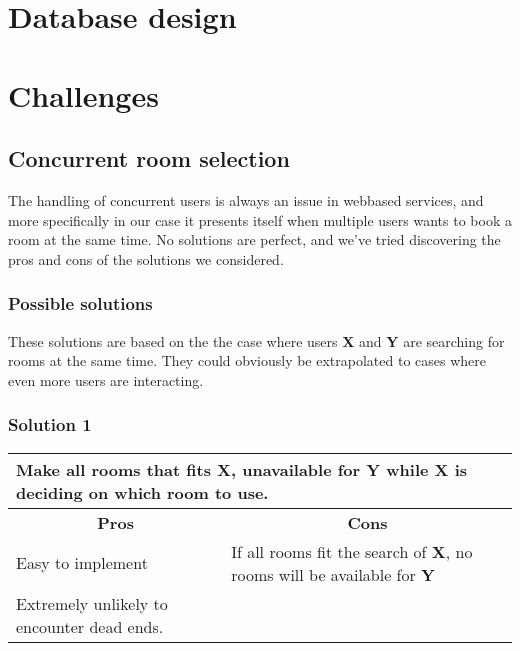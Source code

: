 \section{Database design}
\label{sec:database_design}



\section{Challenges}
\label{sec:challenges}
\subsection{Concurrent room selection}
\label{sub:challenges_concurrent_rooms}
The handling of concurrent users is always an issue in webbased services, and more specifically in our case it presents itself when multiple users wants to book a room at the same time. No solutions are perfect, and we've tried discovering the pros and cons of the solutions we considered.

\subsubsection*{Possible solutions}
These solutions are based on the the case where users \textbf{X} and \textbf{Y} are searching for rooms at the same time. They could obviously be extrapolated to cases where even more users are interacting. 
\subsubsection*{Solution 1}
\begin{tabular}{|p{6cm}|p{6cm}|}
\hline 
	\multicolumn{2}{|p{12cm}|}{Make all rooms that fits \textbf{X}, unavailable for \textbf{Y} while \textbf{X} is deciding on which room to use.} \\ \hline \hline
	\multicolumn{1}{|c|}{\textbf{Pros}} & \multicolumn{1}{c|}{\textbf{Cons}} \\ \hline
	Easy to implement & If all rooms fit the search of \textbf{X}, no rooms will be available for \textbf{Y} \\ \hline
	Extremely unlikely to encounter dead ends. & \\
	\hline
\end{tabular}
\\
